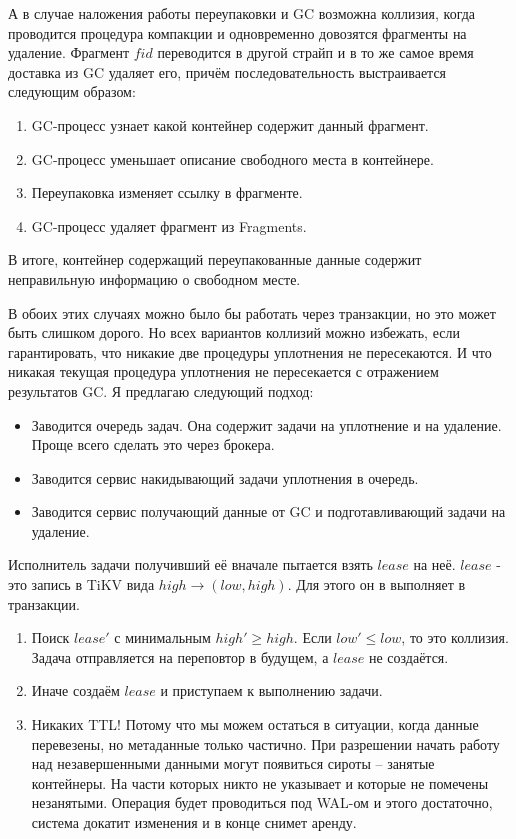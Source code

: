 \documentclass[a4paper,12pt]{article}
\begin{document}
    А в случае наложения работы переупаковки и GC возможна коллизия, когда проводится процедура компакции и одновременно довозятся фрагменты на
    удаление. Фрагмент $fid$ переводится в другой страйп и в то же самое время доставка из GC удаляет его, причём
    последовательность выстраивается следующим образом:
    \begin{enumerate}
        \item GC-процесс узнает какой контейнер содержит данный фрагмент.
        \item GC-процесс уменьшает описание свободного места в контейнере.
        \item Переупаковка изменяет ссылку в фрагменте.
        \item GC-процесс удаляет фрагмент из Fragments.
    \end{enumerate}
    В итоге, контейнер содержащий переупакованные данные содержит неправильную информацию о свободном месте.

    В обоих этих случаях можно было бы работать через транзакции, но это может быть слишком дорого. Но всех вариантов коллизий можно избежать,
    если гарантировать, что никакие две процедуры уплотнения не пересекаются. И что никакая текущая процедура уплотнения не пересекается с отражением
    результатов GC. Я предлагаю следующий подход:

    \begin{itemize}
        \item Заводится очередь задач. Она содержит задачи на уплотнение и на удаление. Проще всего сделать это через брокера.
        \item Заводится сервис накидывающий задачи уплотнения в очередь.
        \item Заводится сервис получающий данные от GC и подготавливающий задачи на удаление.
    \end{itemize}

    Исполнитель задачи получивший её вначале пытается взять $lease$ на неё. $lease$ - это запись в TiKV вида $high \rightarrow (low, high)$. Для этого он в выполняет
    в транзакции.

    \begin{enumerate}
        \item Поиск $lease'$ с минимальным $high' \geqslant high$. Если $low' \leqslant low$, то это коллизия. Задача отправляется на переповтор в будущем, а $lease$ не создаётся.
        \item Иначе создаём $lease$ и приступаем к выполнению задачи.
        \item Никаких TTL! Потому что мы можем остаться в ситуации, когда данные перевезены, но метаданные только частично. При разрешении начать работу над незавершенными
        данными могут появиться сироты – занятые контейнеры. На части которых никто не указывает и которые не помечены незанятыми. Операция будет проводиться под WAL-ом и этого достаточно,
        система докатит изменения и в конце снимет аренду.
    \end{enumerate}
\end{document}
